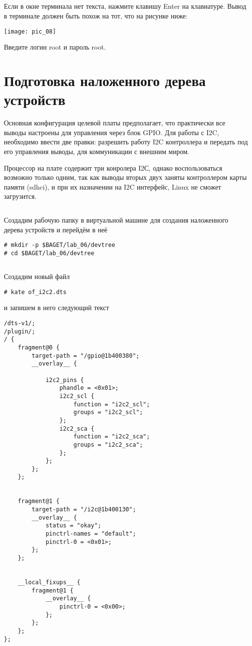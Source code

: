 \subsection{}Если в окне терминала нет текста, нажмите клавишу Enter на клавиатуре. Вывод в терминале должен быть похож на тот, что на рисунке ниже:
\begin{center}
	\texttt{[image: pic\_08]}
\end{center}
Введите логин root и пароль root.


\section{Подготовка наложенного дерева устройств}

Основная конфигурация целевой платы предполагает, что практически все выводы настроены для управления через блок GPIO. Для работы с I2C, необходимо ввести две правки: разрешить работу I2C контроллера и передать под его управления выводы, для коммуникации с внешним миром.  

Процессор на плате содержит три конролера I2С, однако воспользоваться возможно только одним, так как выводы вторых двух заняты контроллером карты памяти (sdhci), и при их назначении на I2C интерфейс, Linux не сможет загрузится.

\subsection{} Создадим рабочую папку в виртуальной машине для создания наложенного дерева устройств и перейдём в неё 
\begin{lstlisting}[style=bash]
# mkdir -p $BAGET/lab_06/devtree
# cd $BAGET/lab_06/devtree 
\end{lstlisting}

\subsection{}Создадим новый файл
\begin{lstlisting}[style=bash]
# kate of_i2c2.dts
\end{lstlisting}
и запишем в него следующий текст
\begin{lstlisting}[style=stdout]
/dts-v1/;
/plugin/;
/ {
	fragment@0 {
		target-path = "/gpio@1b400380";
		__overlay__ {
			
			i2c2_pins {
				phandle = <0x01>;
				i2c2_scl {
					function = "i2c2_scl";
					groups = "i2c2_scl";
				};
				i2c2_sca {
					function = "i2c2_sca";
					groups = "i2c2_sca";
				};
			};
		};
	};
	
	
	fragment@1 { 
		target-path = "/i2c@1b400130"; 
		__overlay__ { 
			status = "okay"; 
			pinctrl-names = "default"; 
			pinctrl-0 = <0x01>; 
		}; 
	}; 
	
	
	__local_fixups__ {
		fragment@1 {
			__overlay__ {
				pinctrl-0 = <0x00>;
			};
		};	
	};
};
\end{lstlisting}

